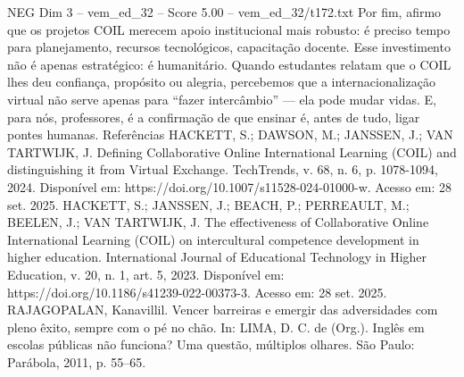 \begin{textsample}{NEG Dim 3 – vem\_ed\_32 – Score 5.00 – vem\_ed\_32/t172.txt}
Por fim, afirmo que os projetos COIL merecem apoio institucional mais robusto: é preciso tempo para planejamento, recursos tecnológicos, capacitação docente.
Esse investimento não é apenas estratégico: é humanitário.
Quando estudantes relatam que o COIL lhes deu confiança, propósito ou alegria, percebemos que a internacionalização virtual não serve apenas para “fazer intercâmbio” — ela pode mudar vidas.
E, para nós, professores, é a confirmação de que ensinar é, antes de tudo, ligar pontes humanas.
Referências HACKETT, S.; DAWSON, M.; JANSSEN, J.; VAN TARTWIJK, J.
Defining Collaborative Online International Learning (COIL) and distinguishing it from Virtual Exchange.
TechTrends, v. 68, n. 6, p. 1078-1094, 2024.
Disponível em: https://doi.org/10.1007/s11528-024-01000-w.
Acesso em: 28 set. 2025.
HACKETT, S.; JANSSEN, J.; BEACH, P.; PERREAULT, M.; BEELEN, J.; VAN TARTWIJK, J.
The effectiveness of Collaborative Online International Learning (COIL) on intercultural competence development in higher education.
International Journal of Educational Technology in Higher Education, v. 20, n. 1, art. 5, 2023.
Disponível em: https://doi.org/10.1186/s41239-022-00373-3.
Acesso em: 28 set. 2025.
RAJAGOPALAN, Kanavillil.
Vencer barreiras e emergir das adversidades com pleno êxito, sempre com o pé no chão.
In: LIMA, D.
C. de (Org.).
Inglês em escolas públicas não funciona?
Uma questão, múltiplos olhares.
São Paulo: Parábola, 2011, p. 55–65.

\end{textsample}
